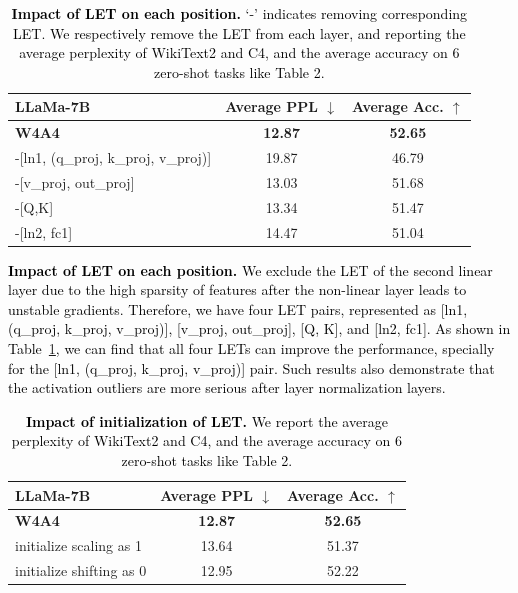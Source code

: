 \documentclass{article} %
\begin{document}
\begin{table}[!ht]
    \centering
    \caption{\textcolor{black}{\textbf{Impact of LET on each position.} `-' indicates removing corresponding LET. We respectively remove the LET from each layer, and reporting the average perplexity of WikiText2 and C4, and the average accuracy on 6 zero-shot tasks like Table 2.}}
    \color{black}
    \begin{tabular}{lcc}
    \hline
    \textbf{LLaMa-7B} & \textbf{Average PPL $\downarrow$} & \textbf{Average Acc. $\uparrow$} \\
    \hline
    \textbf{W4A4} & \textbf{12.87} & \textbf{52.65} \\
    -[ln1, (q\_proj, k\_proj, v\_proj)] & 19.87 & 46.79 \\
    -[v\_proj, out\_proj] & 13.03 & 51.68 \\
    -[Q,K] & 13.34 & 51.47 \\
    -[ln2, fc1] & 14.47 & 51.04 \\
    \hline
    \end{tabular}
    \label{tab:ablation_let_position}
\end{table}

\textcolor{black}{
\textbf{Impact of LET on each position.} We exclude the LET of the second linear layer due to the high sparsity of features after the non-linear layer leads to unstable gradients. Therefore, we have four LET pairs, represented as [ln1, (q\_proj, k\_proj, v\_proj)], [v\_proj, out\_proj], [Q, K], and [ln2, fc1].  As shown in Table~\ref{tab:ablation_let_position}, we can find that all four LETs can improve the performance, specially for the [ln1, (q\_proj, k\_proj, v\_proj)] pair. Such results also demonstrate that the activation outliers are more serious after layer normalization layers.
}


\begin{table}[!ht]
    \centering
    \caption{\textcolor{black}{\textbf{Impact of initialization of LET.} We report the average perplexity of WikiText2 and C4, and the average accuracy on 6 zero-shot tasks like Table 2.}}
    \color{black}
    \begin{tabular}{lcc}
    \hline
    \textbf{LLaMa-7B} & \textbf{Average PPL $\downarrow$} & \textbf{Average Acc. $\uparrow$} \\
    \hline
    \textbf{W4A4} & \textbf{12.87} & \textbf{52.65} \\
    initialize scaling as 1 & 13.64 & 51.37 \\
    initialize shifting as 0 & 12.95 & 52.22 \\
    \hline
    \end{tabular}
    \label{tab:ablation_initialization}
\end{table}
\end{document}

